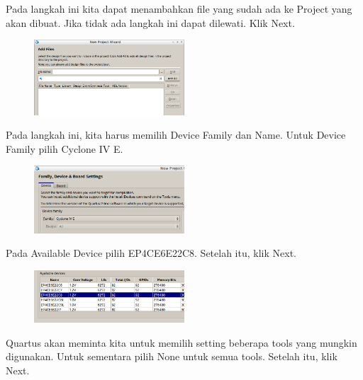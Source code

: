 Pada langkah ini kita dapat menambahkan file yang sudah ada ke Project
yang akan dibuat. Jika tidak ada langkah ini dapat dilewati.
Klik {\sf Next}.

\begin{figure}[H]
\centering
\includegraphics[width=0.5\textwidth]{images/NewProjectWizard_4.png}
\par
\end{figure}

Pada langkah ini, kita harus memilih {\sf Device Family} dan
{\sf Name}. Untuk {\sf Device Family} pilih {\sf Cyclone IV E}.

\begin{figure}[H]
\centering
\includegraphics[width=0.5\textwidth]{images/NewProjectWizard_5_device_family.png}
\par
\end{figure}

Pada {\sf Available Device} pilih {\sf EP4CE6E22C8}.
Setelah itu, klik {\sf Next}.

\begin{figure}[H]
\centering
\includegraphics[width=0.5\textwidth]{images/NewProjectWizard_5_device_name.png}
\par
\end{figure}


Quartus akan meminta kita untuk memilih setting beberapa tools yang
mungkin digunakan. Untuk sementara pilih {\sf None} untuk semua tools.
Setelah itu, klik {\sf Next}.

